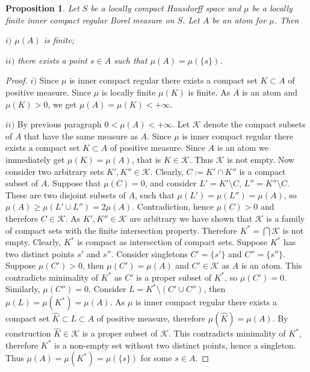 \documentclass[12pt]{article}
\newtheorem{proposition}[theorem]{Proposition}
\begin{document}
\begin{proposition}\label{MeasAtomCharac} Let $S$ be a locally compact Hausdorff space and $\mu$ be a locally finite inner compact regular Borel measure on $S$. Let $A$ be an atom for $\mu$. Then

    $i)$ $\mu(A)$ is finite;

    $ii)$ there exists a point $s\in A$ such that $\mu(A)=\mu(\{s\})$.
\end{proposition}
\begin{proof} $i)$ Since $\mu$ is inner compact regular there exists a compact set $K\subset A$ of positive measure. Since $\mu$ is locally finite $\mu(K)$ is finite. As $A$ is an atom and $\mu(K)>0$, we get $\mu(A)=\mu(K)<+\infty$.

    $ii)$ By previous paragraph $0<\mu(A)<+\infty$. Let $\mathcal{K}$ denote the compact subsets of $A$ that have the same measure as $A$. Since $\mu$ is inner compact regular there exists a compact set $K\subset A$ of positive measure. Since $A$ is an atom we immediately get $\mu(K)=\mu(A)$, that is $K\in\mathcal{K}$. Thus $\mathcal{K}$ is not empty. Now consider two arbitrary sets $K',K''\in\mathcal{K}$. Clearly, $C:=K'\cap K''$ is a compact subset of $A$. Suppose that $\mu(C)=0$, and consider $L'=K'\setminus C$, $L''=K''\setminus C$. These are two disjoint subsets of $A$, such that $\mu(L')=\mu(L'')=\mu(A)$, so $\mu(A)\geq \mu(L'\cup L'')=2\mu(A)$. Contradiction, hence $\mu(C)>0$ and therefore $C\in\mathcal{K}$. As $K', K''\in \mathcal{K}$ are arbitrary we have shown that $\mathcal{K}$ is a family of compact sets with the finite intersection property. Therefore $K^*=\bigcap\mathcal{K}$ is not empty. Clearly, $K^*$ is compact as intersection of compact sets. Suppose $K^*$ has two distinct points $s'$ and $s''$. Consider singletons $C'=\{s'\}$ and $C''=\{s''\}$. Suppose $\mu(C')>0$, then $\mu(C')=\mu(A)$ and $C'\in\mathcal{K}$ as $A$ is an atom. This contradicts minimality of $K^*$ as $C'$ is a proper subset of $K^*$, so $\mu(C')=0$. Similarly, $\mu(C'')=0$. Consider $L=K^*\setminus (C'\cup C'')$, then $\mu(L)=\mu(K^*)=\mu(A)$. As $\mu$ is inner compact regular there exists a compact set $\hat{K}\subset L\subset A$ of positive measure, therefore $\mu(\hat{K})=\mu(A)$. By construction $\hat{K}\in\mathcal{K}$ is a proper subset of $\mathcal{K}$. This contradicts minimality of $K^*$, therefore $K^*$ is a non-empty set without two distinct points, hence a singleton. Thus $\mu(A)=\mu(K^*)=\mu(\{s\})$ for some $s\in A$.
\end{proof}
\end{document}
